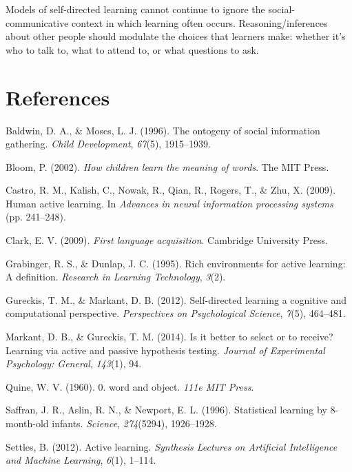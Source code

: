\documentclass[a4paper,man,apacite,floatsintext]{apa6}
\begin{document}
Models of self-directed learning cannot continue to ignore the
social-communicative context in which learning often occurs.
Reasoning/inferences about other people should modulate the choices that
learners make: whether it's who to talk to, what to attend to, or what
questions to ask.

\newpage

\section{References}\label{references}

\setlength{\parindent}{-0.4in} \setlength{\leftskip}{0.125in} \noindent

\hypertarget{refs}{}
\hypertarget{ref-baldwin1996ontogeny}{}
Baldwin, D. A., \& Moses, L. J. (1996). The ontogeny of social
information gathering. \emph{Child Development}, \emph{67}(5),
1915--1939.

\hypertarget{ref-bloom2002children}{}
Bloom, P. (2002). \emph{How children learn the meaning of words}. The
MIT Press.

\hypertarget{ref-castro2009human}{}
Castro, R. M., Kalish, C., Nowak, R., Qian, R., Rogers, T., \& Zhu, X.
(2009). Human active learning. In \emph{Advances in neural information
processing systems} (pp. 241--248).

\hypertarget{ref-clark2009first}{}
Clark, E. V. (2009). \emph{First language acquisition}. Cambridge
University Press.

\hypertarget{ref-grabinger1995rich}{}
Grabinger, R. S., \& Dunlap, J. C. (1995). Rich environments for active
learning: A definition. \emph{Research in Learning Technology},
\emph{3}(2).

\hypertarget{ref-gureckis2012self}{}
Gureckis, T. M., \& Markant, D. B. (2012). Self-directed learning a
cognitive and computational perspective. \emph{Perspectives on
Psychological Science}, \emph{7}(5), 464--481.

\hypertarget{ref-markant2014better}{}
Markant, D. B., \& Gureckis, T. M. (2014). Is it better to select or to
receive? Learning via active and passive hypothesis testing.
\emph{Journal of Experimental Psychology: General}, \emph{143}(1), 94.

\hypertarget{ref-quine19600}{}
Quine, W. V. (1960). 0. word and object. \emph{111e MIT Press}.

\hypertarget{ref-saffran1996statistical}{}
Saffran, J. R., Aslin, R. N., \& Newport, E. L. (1996). Statistical
learning by 8-month-old infants. \emph{Science}, \emph{274}(5294),
1926--1928.

\hypertarget{ref-settles2012active}{}
Settles, B. (2012). Active learning. \emph{Synthesis Lectures on
Artificial Intelligence and Machine Learning}, \emph{6}(1), 1--114.


\end{document}
